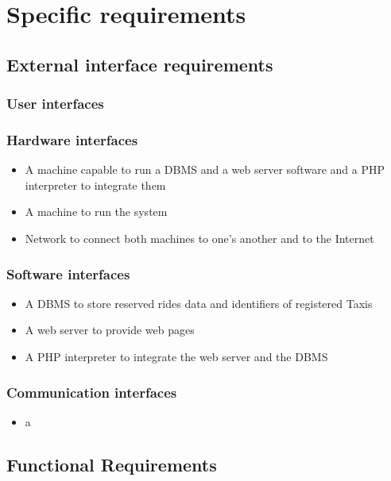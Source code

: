 \section{Specific requirements}
	\subsection{External interface requirements}
		\subsubsection{User interfaces}
		\subsubsection{Hardware interfaces}
		\begin{itemize}
			\item A machine capable to run a DBMS and a web server software and a PHP interpreter to integrate them
			\item A machine to run the system
			\item Network to connect both machines to one's another and to the Internet
		\end{itemize}
		\subsubsection{Software interfaces}
		\begin{itemize}
			\item A DBMS to store reserved rides data and identifiers of registered Taxis
			\item A web server to provide web pages
			\item A PHP interpreter to integrate the web server and the DBMS
		\end{itemize}
		\subsubsection{Communication interfaces}
		\begin{itemize}
			\item a 
		\end{itemize}
	\subsection{Functional Requirements}
